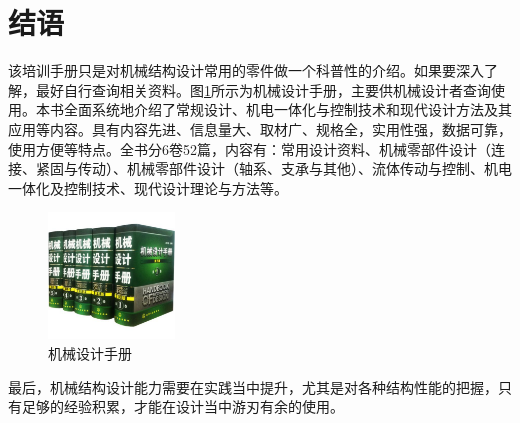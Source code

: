 \documentclass[UTF8]{article} %
\begin{document}
\section{结语}
该培训手册只是对机械结构设计常用的零件做一个科普性的介绍。如果要深入了解，最好自行查询相关资料。图\ref{jxs}所示为机械设计手册，主要供机械设计者查询使用。本书全面系统地介绍了常规设计、机电一体化与控制技术和现代设计方法及其应用等内容。具有内容先进、信息量大、取材广、规格全，实用性强，数据可靠，使用方便等特点。全书分6卷52篇，内容有：常用设计资料、机械零部件设计（连接、紧固与传动）、机械零部件设计（轴系、支承与其他）、流体传动与控制、机电一体化及控制技术、现代设计理论与方法等\cite{bai}。

\begin{figure}[h]
  \centering
  \includegraphics[width=0.3\textwidth]{jx.png}
  \caption{机械设计手册}
  \label{jxs}
\end{figure}

最后，机械结构设计能力需要在实践当中提升，尤其是对各种结构性能的把握，只有足够的经验积累，才能在设计当中游刃有余的使用。


 
\end{document}
